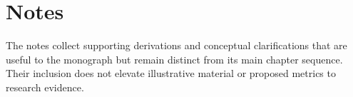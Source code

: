 \part*{Notes}

The notes collect supporting derivations and conceptual clarifications that are
useful to the monograph but remain distinct from its main chapter sequence.
Their inclusion does not elevate illustrative material or proposed metrics to
research evidence.








